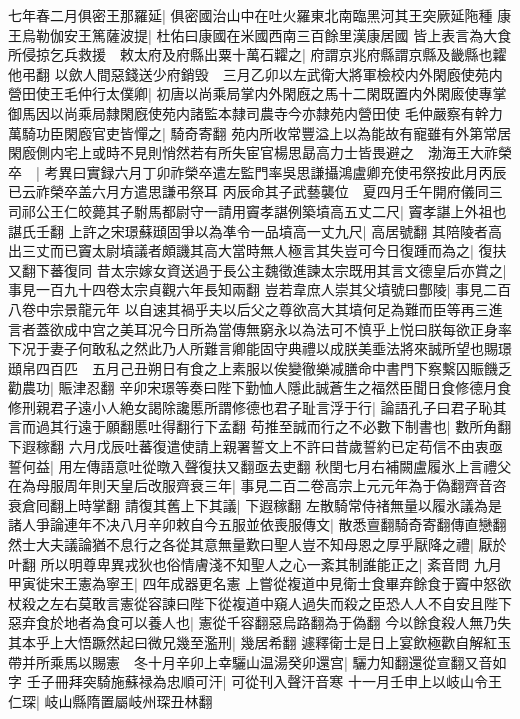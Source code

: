 七年春二月俱密王那羅延|{
	俱密國治山中在吐火羅東北南臨黑河其王突厥延陁種}
康王烏勒伽安王篤薩波提|{
	杜佑曰康國在米國西南三百餘里漢康居國}
皆上表言為大食所侵掠乞兵救援　敕太府及府縣出粟十萬石糶之|{
	府謂京兆府縣謂京縣及畿縣也糶他弔翻}
以歛人間惡錢送少府銷毁　三月乙卯以左武衛大將軍檢校内外閑廏使苑内營田使王毛仲行太僕卿|{
	初唐以尚乘局掌内外閑廐之馬十二閑既置内外閑廄使專掌御馬因以尚乘局隸閑廐使苑内諸監本隸司農寺今亦隸苑内營田使}
毛仲嚴察有幹力萬騎功臣閑廏官吏皆憚之|{
	騎奇寄翻}
苑内所收常豐溢上以為能故有寵雖有外第常居閑廏側内宅上或時不見則悄然若有所失宦官楊思勗高力士皆畏避之　渤海王大祚榮卒　|{
	考異曰實録六月丁卯祚榮卒遣左監門率吳思謙攝鴻盧卿充使弔祭按此月丙辰已云祚榮卒盖六月方遣思謙弔祭耳}
丙辰命其子武藝襲位　夏四月壬午開府儀同三司祁公王仁皎薨其子駙馬都尉守一請用竇孝諶例築墳高五丈二尺|{
	竇孝諶上外祖也諶氏壬翻}
上許之宋璟蘇頲固爭以為凖令一品墳高一丈九尺|{
	高居號翻}
其陪陵者高出三丈而已竇太尉墳議者頗譏其高大當時無人極言其失豈可今日復踵而為之|{
	復扶又翻下蕃復同}
昔太宗嫁女資送過于長公主魏徵進諫太宗既用其言文德皇后亦賞之|{
	事見一百九十四卷太宗貞觀六年長知兩翻}
豈若韋庶人崇其父墳號曰酆陵|{
	事見二百八卷中宗景龍元年}
以自速其禍乎夫以后父之尊欲高大其墳何足為難而臣等再三進言者蓋欲成中宫之美耳况今日所為當傳無窮永以為法可不慎乎上悦曰朕每欲正身率下况于妻子何敢私之然此乃人所難言卿能固守典禮以成朕美埀法將來誠所望也賜璟頲帛四百匹　五月己丑朔日有食之上素服以俟變徹樂减膳命中書門下察繫囚賑饑乏勸農功|{
	賑津忍翻}
辛卯宋璟等奏曰陛下勤恤人隱此誠蒼生之福然臣聞日食修德月食修刑親君子遠小人絶女謁除讒慝所謂修德也君子耻言浮于行|{
	論語孔子曰君子恥其言而過其行遠于願翻慝吐得翻行下孟翻}
苟推至誠而行之不必數下制書也|{
	數所角翻下遐稼翻}
六月戊辰吐蕃復遣使請上親署誓文上不許曰昔歲誓約已定苟信不由衷亟誓何益|{
	用左傳語意吐從暾入聲復扶又翻亟去吏翻}
秋閏七月右補闕盧履氷上言禮父在為母服周年則天皇后改服齊衰三年|{
	事見二百二卷高宗上元元年為于偽翻齊音咨衰倉囘翻上時掌翻}
請復其舊上下其議|{
	下遐稼翻}
左散騎常侍禇無量以履氷議為是諸人爭論連年不决八月辛卯敕自今五服並依喪服傳文|{
	散悉亶翻騎奇寄翻傳直戀翻}
然士大夫議論猶不息行之各從其意無量歎曰聖人豈不知母恩之厚乎厭降之禮|{
	厭於叶翻}
所以明尊卑異戎狄也俗情膚淺不知聖人之心一紊其制誰能正之|{
	紊音問}
九月甲寅徙宋王憲為寧王|{
	四年成器更名憲}
上嘗從複道中見衛士食畢弃餘食于竇中怒欲杖殺之左右莫敢言憲從容諫曰陛下從複道中窺人過失而殺之臣恐人人不自安且陛下惡弃食於地者為食可以養人也|{
	憲從千容翻惡烏路翻為于偽翻}
今以餘食殺人無乃失其本乎上大悟蹶然起曰微兄幾至濫刑|{
	幾居希翻}
遽釋衛士是日上宴飲極歡自解紅玉帶并所乘馬以賜憲　冬十月辛卯上幸驪山温湯癸卯還宫|{
	驪力知翻還從宣翻又音如字}
壬子冊拜突騎施蘇禄為忠順可汗|{
	可從刊入聲汗音寒}
十一月壬申上以岐山令王仁琛|{
	岐山縣隋置屬岐州琛丑林翻}
